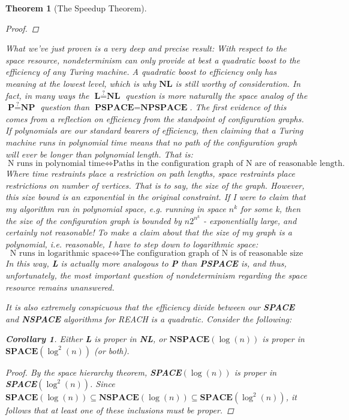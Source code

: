 \documentclass{article}
\theoremstyle{definition}
\theoremstyle{plain}
\theoremstyle{theorem}
\newtheorem{theorem}{Theorem}[section]
\newtheorem{corollary}{Corollary}[section]
\begin{document}
\begin{theorem}[The Speedup Theorem]
\begin{proof}
\end{proof}
What we've just proven is a very deep and precise result: \textit{With respect to the space resource, nondeterminism can only provide at best a quadratic boost to the efficiency of any Turing machine.} A quadratic boost to efficiency only has meaning at the lowest level, which is why $\textbf{NL}$ is still worthy of consideration. In fact, in many ways the $\textbf{L} \overset{?}{=} \textbf{NL}$ question is more naturally the space analog of the $\textbf{P} \overset{?}{=} \textbf{NP}$ question than $\textbf{PSPACE} = \textbf{NPSPACE}$. The first evidence of this comes from a reflection on efficiency from the standpoint of configuration graphs. If polynomials are our standard bearers of efficiency, then claiming that a Turing machine runs in polynomial time means that no path of the configuration graph will ever be longer than polynomial length. That is:
\[\textrm{N runs in polynomial time} \iff \textrm{Paths in the configuration graph of N are of reasonable length.} \]
Where time restraints place a restriction on path lengths, space restraints place restrictions on number of vertices. That is to say, \textit{the size of the graph}. However, this size bound is an exponential in the original constraint. If I were to claim that my algorithm ran in polynomial space, e.g. running in space $n^k$ for some k, then the size of the configuration graph is bounded by $n2^{n^k}$ - exponentially large, and certainly not reasonable! To make a claim about that the size of my graph is a polynomial, i.e. reasonable, I have to step down to logarithmic space:
\[\textrm{N runs in logarithmic space} \iff \textrm{The configuration graph of N is of reasonable size} \]
In this way, \textbf{L} is actually more analogous to \textbf{P} than \textbf{PSPACE} is, and thus, unfortunately, the most important question of nondeterminism regarding the space resource remains unanswered.
\par It is also extremely conspicuous that the efficiency divide between our \textbf{SPACE} and \textbf{NSPACE} algorithms for REACH is a quadratic. Consider the following:
\begin{corollary}
	Either \textbf{L} is proper in \textbf{NL}, or $\textbf{NSPACE}(\log(n))$ is proper in $\textbf{SPACE}(\log^2(n))$ (or both).
\end{corollary}
\begin{proof}
	By the space hierarchy theorem, \textbf{SPACE}$(\log(n))$ is proper in \textbf{SPACE}$(\log^2(n))$. Since $\textbf{SPACE}(\log(n)) \subseteq \textbf{NSPACE}(\log(n)) \subseteq \textbf{SPACE}(\log^2(n))$, it follows that at least one of these inclusions must be proper.

\end{proof}
\end{theorem}
\end{document}
